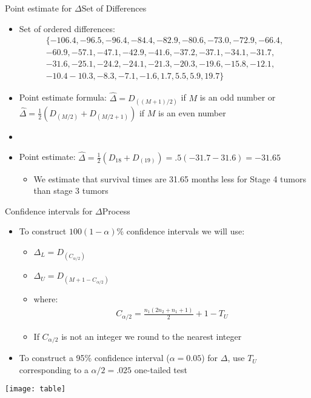 \documentclass[xcolor=dvipsnames]{beamer}
\begin{document}
\begin{frame}{Point estimate for $\Delta$}{Set of Differences}
	\begin{itemize}
		\item Set of ordered differences: 
		\begin{gather*}
			\{-106.4,  -96.5,  -96.4,  -84.4,  -82.9,  -80.6,  -73.0,  -72.9,  -66.4,\\ -60.9,  -57.1,  -47.1,  -42.9, -41.6,  -37.2,  -37.1,  -34.1, 
			-31.7, \\ -31.6,  -25.1,  -24.2,  -24.1,  -21.3,  -20.3,  -19.6,  -15.8,  -12.1, \\ -10.4   -10.3,   -8.3,   -7.1,   -1.6,    1.7,    5.5, 5.9,   19.7\}
		\end{gather*}
		\item Point estimate formula: $\hat{\Delta} = D_{((M+1)/2)}$ if $M$ is an odd number or $\hat{\Delta} = \frac{1}{2} (D_{(M/2)} + D_{(M/2+1)})$ if $M$ is an even number
		\item[]
		\item Point estimate: $\hat{\Delta} = \frac{1}{2} (D_{18} + D_{(19)}) = .5(-31.7 - 31.6) = -31.65$
		\begin{itemize}
			\item We estimate that survival times are 31.65 months less for Stage 4 tumors than stage 3 tumors
		\end{itemize}
	\end{itemize}
\end{frame}

\begin{frame}{Confidence intervals for $\Delta$}{Process}
\begin{itemize}
	\item To construct $100(1-\alpha) \%$ confidence intervals we will use:
	\begin{itemize}
		\item $\Delta_L = D_{(C_{\alpha / 2})}$
		\item $\Delta_U = D_{(M + 1 - C_{\alpha / 2})}$
		\item where:
		\begin{gather*}
		C_{\alpha / 2} = \frac{n_1 (2n_2 + n_1 + 1)}{2} + 1 - T_U
		\end{gather*}
				\item If $C_{\alpha / 2}$ is not an integer we round to the nearest integer
	\end{itemize}
	\item To construct a 95\% confidence interval ($\alpha = 0.05$) for $\Delta$, use $T_U$ corresponding to a $\alpha /2 = .025$ one-tailed test
\end{itemize}
\begin{center}
	\texttt{[image: table]}
\end{center}
\end{frame}
\end{document}
